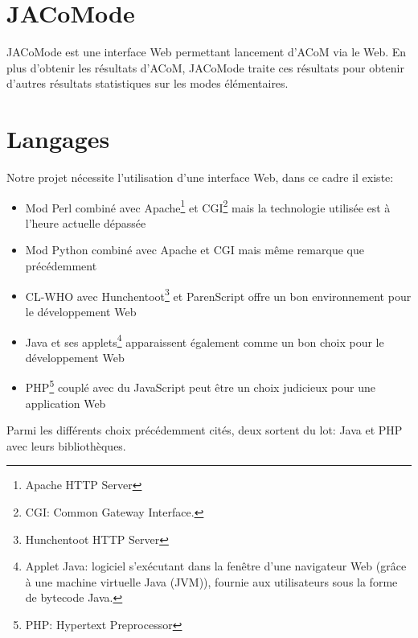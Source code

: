 \section{JACoMode}
JACoMode est une interface Web permettant lancement d'ACoM via le Web. En plus d'obtenir les résultats d'ACoM, JACoMode traite ces résultats pour obtenir d'autres résultats statistiques sur les modes élémentaires.

\section{Langages}
Notre projet nécessite l'utilisation d'une interface Web, dans ce cadre il existe:
\begin{itemize}
\item Mod Perl combiné avec Apache\footnote{Apache HTTP Server} et CGI\footnote{CGI: Common Gateway Interface.} mais la technologie utilisée est à l'heure actuelle dépassée
\item Mod Python combiné avec Apache et CGI mais même remarque que précédemment
\item CL-WHO avec Hunchentoot\footnote{Hunchentoot HTTP Server} et ParenScript offre un bon environnement pour le développement Web
\item Java et ses applets\footnote{Applet Java: logiciel s'exécutant dans la fenêtre d'une navigateur Web (grâce à une machine virtuelle Java (JVM)), fournie aux utilisateurs sous la forme de bytecode Java.} apparaissent également comme un bon choix pour le développement Web
\item PHP\footnote{PHP: Hypertext Preprocessor} couplé avec du JavaScript peut être un choix judicieux pour une application Web
\end{itemize}

Parmi les différents choix précédemment cités, deux sortent du lot: Java et PHP avec leurs bibliothèques.